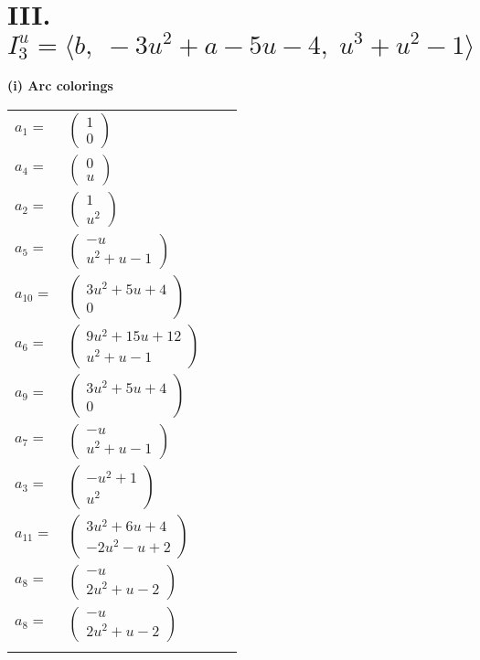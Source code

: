 \documentclass[1p]{elsarticle_modified}
\theoremstyle{definition}
\begin{document}
\centering \section*{III. $I^u_{3}= \langle b,\;-3 u^2+a-5 u-4,\;u^3+u^2-1 \rangle$}
\flushleft \textbf{(i) Arc colorings}\\
\begin{tabular}{m{7pt} m{180pt} m{7pt} m{180pt} }
\flushright $a_{1}=$&$\begin{pmatrix}1\\0\end{pmatrix}$ \\
\flushright $a_{4}=$&$\begin{pmatrix}0\\u\end{pmatrix}$ \\
\flushright $a_{2}=$&$\begin{pmatrix}1\\u^2\end{pmatrix}$ \\
\flushright $a_{5}=$&$\begin{pmatrix}- u\\u^2+u-1\end{pmatrix}$ \\
\flushright $a_{10}=$&$\begin{pmatrix}3 u^2+5 u+4\\0\end{pmatrix}$ \\
\flushright $a_{6}=$&$\begin{pmatrix}9 u^2+15 u+12\\u^2+u-1\end{pmatrix}$ \\
\flushright $a_{9}=$&$\begin{pmatrix}3 u^2+5 u+4\\0\end{pmatrix}$ \\
\flushright $a_{7}=$&$\begin{pmatrix}- u\\u^2+u-1\end{pmatrix}$ \\
\flushright $a_{3}=$&$\begin{pmatrix}- u^2+1\\u^2\end{pmatrix}$ \\
\flushright $a_{11}=$&$\begin{pmatrix}3 u^2+6 u+4\\-2 u^2- u+2\end{pmatrix}$ \\
\flushright $a_{8}=$&$\begin{pmatrix}- u\\2 u^2+u-2\end{pmatrix}$\\ \flushright $a_{8}=$&$\begin{pmatrix}- u\\2 u^2+u-2\end{pmatrix}$\\&\end{tabular}
\end{document}
